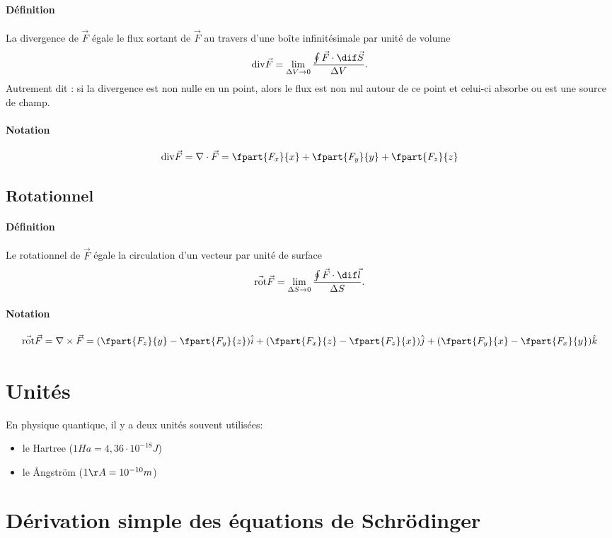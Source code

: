 \paragraph{Définition} 
La divergence de $\vec{F}$ égale le flux sortant de $\vec{F}$ 
au travers d'une boîte infinitésimale par unité de volume
\[ {\rm div}{\vec{F}} = \lim_{\Delta V \to 0} \frac{\oint{\vec{F}\cdot\dif\vec{S}}}{\Delta V}.\]
Autrement dit : si la divergence est non nulle en un point, alors le flux est
non nul autour de ce point et celui-ci absorbe ou est une source de champ.
\paragraph{Notation}
\[ {\rm div}{\vec{F}} = \nabla\cdot\vec{F} = \fpart{F_x}{x} + \fpart{F_y}{y} + \fpart{F_z}{z}\]

\subsection{Rotationnel}
\paragraph{Définition}
Le rotationnel de $\vec{F}$ égale la circulation d'un vecteur
par unité de surface
\[ \vec{{\rm rot}}{\vec{F}} = \lim_{\Delta S \to 0} \frac{\oint{\vec{F}\cdot\dif\vec{l}}}{\Delta S}.\] 
\paragraph{Notation}
\[ \vec{{\rm rot}}{\vec{F}} = \nabla\times\vec{F} = (\fpart{F_z}{y}-\fpart{F_y}{z})\hat{i}
+ (\fpart{F_x}{z}-\fpart{F_z}{x})\hat{j} + (\fpart{F_y}{x}-\fpart{F_x}{y})\hat{k}\]

\section{Unités}
En physique quantique, il y a deux unités souvent utilisées:
\begin{itemize}
\item le Hartree ($1Ha =  4,36\cdot 10^{-18} J$)
\item le \AA ngstr\"om ($1 \AA = 10^{-10} m$)
\end{itemize}

\section{Dérivation simple des équations de Schrödinger}
\label{sec:deriv-eq}
